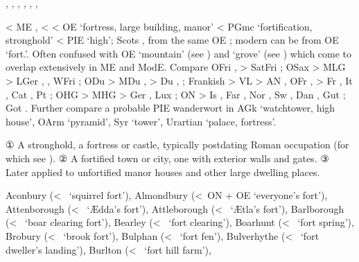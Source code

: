 \documentclass[12pt,letterpaper,oneside,article,draft]{memoir}
\begin{document}
\begin{Lemma}
\begin{Also}
	, , , , , , 
\end{Also}
\begin{Etymology}
	< ME ,  <   < OE  ‘fortress, large building, manor’
		< PGmc  ‘fortification, stronghold’ < PIE  ‘high’; Scots
		,  from the same OE ;
		modern  can be from OE  ‘fort.’.
	Often confused with OE  ‘mountain’ (see ) and  ‘grove’ (see )
		which come to overlap extensively in ME and ModE.
	Compare
	OFri ,  > SatFri ;
	OSax  > MLG  > LGer , , WFri ;
	ODu  > MDu ,  > Du , ;
	Frankish  > VL  > AN , OFr ,  > Fr ,
		It , Cat , Pt ;
	OHG  > MHG  > Ger , Lux ;
	ON  > Is , Far , Nor , Sw , Dan , Gut ;
	Got  .
	Further compare a probable PIE wanderwort in
	AGk   ‘watchtower, high house’,
		OArm   ‘pyramid’,
		Syr   ‘tower’,
		Urartian  ‘palace, fortress’.
\end{Etymology}
\begin{Definitions}
	① A stronghold, a fortress or castle, typically postdating Roman occupation (for which see ).
	② A fortified town or city, one with exterior walls and gates.
	③ Later applied to unfortified manor houses and other large dwelling places.
\end{Definitions}
\begin{Examples}
	Aconbury (<~ ‘squirrel fort’),
	Almondbury (<~ON  + OE  ‘everyone’s fort’),
	Attenborough (<~ ‘Ædda’s fort’),
	Attleborough (<~ ‘Ætla’s fort’),
	Barlborough (<~ ‘boar clearing fort’),
	Bearley (<~ ‘fort clearing’),
	Boarhunt (<~ ‘fort spring’),
	Brobury (<~ ‘brook fort’),
	Bulphan (<~ ‘fort fen’),
	Bulverhythe (<~ ‘fort dweller’s landing’),
	Burlton (<~ ‘fort hill farm’),

\end{Examples}
\end{Lemma}
\end{document}
